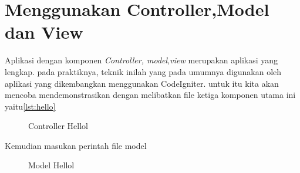 \section{Menggunakan Controller,Model dan View}
Aplikasi dengan komponen \textit{Controller, model,view} merupakan aplikasi yang lengkap. pada praktiknya, teknik inilah yang pada umumnya digunakan oleh aplikasi yang dikembangkan menggunakan CodeIgniter.
untuk itu kita akan mencoba mendemonstrasikan dengan melibatkan file ketiga komponen utama ini yaitu\ref{lst:hello}
\begin{figure}
\caption{Controller Hellol}
\label{Gambar 14}
\end{figure}

Kemudian masukan perintah file model

\begin{figure}
\caption{Model Hellol}
\label{Gambar 15}
\end{figure}

